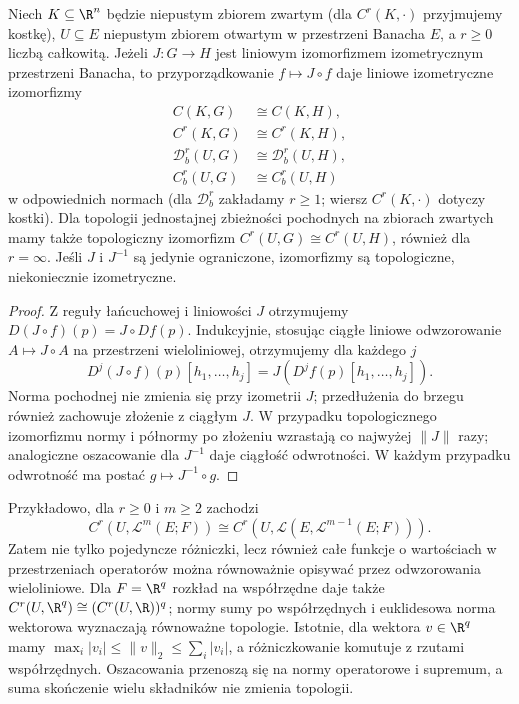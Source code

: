 \begin{stwierdzenie}
\label{ma2:prop:operator-valued-function-isomorphisms}
Niech $K\subseteq\R^n$ będzie niepustym zbiorem
zwartym (dla $C^r(K,\cdot)$ przyjmujemy kostkę),
$U\subseteq E$ niepustym zbiorem otwartym w przestrzeni
Banacha $E$, a $r\ge0$ liczbą całkowitą.
Jeżeli $J:G\to H$ jest liniowym izomorfizmem
izometrycznym przestrzeni Banacha, to przyporządkowanie
$f\mapsto J\circ f$ daje liniowe izometryczne izomorfizmy
\[
 \begin{aligned}
 C(K,G)&\cong C(K,H),\\
 C^r(K,G)&\cong C^r(K,H),\\
 \mathcal D_b^r(U,G)&\cong\mathcal D_b^r(U,H),\\
 C_b^r(U,G)&\cong C_b^r(U,H)
 \end{aligned}
\]
w odpowiednich normach (dla $\mathcal D_b^r$ zakładamy
$r\ge1$; wiersz $C^r(K,\cdot)$ dotyczy kostki).
Dla topologii jednostajnej zbieżności pochodnych
na zbiorach zwartych mamy także topologiczny
izomorfizm $C^r(U,G)\cong C^r(U,H)$,
również dla $r=\infty$.
Jeśli $J$ i $J^{-1}$ są jedynie ograniczone,
izomorfizmy są topologiczne, niekoniecznie izometryczne.
\end{stwierdzenie}
\begin{proof}
Z reguły łańcuchowej i liniowości $J$ otrzymujemy
$D(J\circ f)(p)=J\circ Df(p)$.
Indukcyjnie, stosując ciągłe liniowe odwzorowanie
$A\mapsto J\circ A$ na przestrzeni wieloliniowej,
otrzymujemy dla każdego $j$
\[
 D^j(J\circ f)(p)[h_1,\ldots,h_j]
 =J(D^jf(p)[h_1,\ldots,h_j]).
\]
Norma pochodnej nie zmienia się przy izometrii $J$;
przedłużenia do brzegu również zachowuje złożenie
z ciągłym $J$. W przypadku topologicznego izomorfizmu
normy i półnormy po złożeniu wzrastają co najwyżej
$\|J\|$ razy; analogiczne oszacowanie dla $J^{-1}$
daje ciągłość odwrotności. W każdym przypadku
odwrotność ma postać $g\mapsto J^{-1}\circ g$.
\end{proof}

Przykładowo, dla $r\ge0$ i $m\ge2$ zachodzi
\[
 C^r(U,\mathcal L^m(E;F))\cong
 C^r(U,\mathcal L(E,\mathcal L^{m-1}(E;F))).
\]
Zatem nie tylko pojedyncze różniczki, lecz również
całe funkcje o wartościach w przestrzeniach operatorów
można równoważnie opisywać przez odwzorowania
wieloliniowe. Dla $F=\R^q$ rozkład na współrzędne
daje także $C^r(U,\R^q)\cong(C^r(U,\R))^q$;
normy sumy po współrzędnych i euklidesowa
norma wektorowa wyznaczają równoważne topologie.
Istotnie, dla wektora $v\in\R^q$ mamy
$\max_i|v_i|\le\|v\|_2\le\sum_i|v_i|$,
a różniczkowanie komutuje z rzutami współrzędnych.
Oszacowania przenoszą się na normy operatorowe
i supremum, a suma skończenie wielu składników
nie zmienia topologii.

